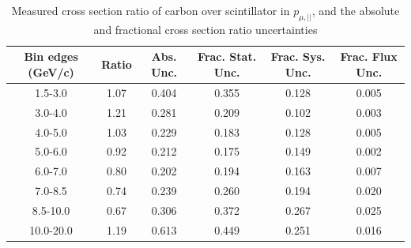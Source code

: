 \documentclass[../main.tex]{subfiles}
\begin{document}
\begin{table}
  \centering
  \renewcommand{\arraystretch}{1.15}
  \caption{Measured cross section ratio of carbon over scintillator in $p_{\mu,||}$, and the absolute and fractional cross section ratio uncertainties}
    \begin{tabular}{c||c|c||c|c|c}
      Bin edges (GeV/c) &  Ratio  &  Abs. Unc.  &  Frac. Stat. Unc.  &  Frac. Sys. Unc.  &  Frac. Flux Unc. \\
      \hline
      \hline
      1.5-3.0 & 1.07 & 0.404 & 0.355 & 0.128 & 0.005\\
      3.0-4.0 & 1.21 & 0.281 & 0.209 & 0.102 & 0.003\\
      4.0-5.0 & 1.03 & 0.229 & 0.183 & 0.128 & 0.005\\
      5.0-6.0 & 0.92 & 0.212 & 0.175 & 0.149 & 0.002\\
      6.0-7.0 & 0.80 & 0.202 & 0.194 & 0.163 & 0.007\\
      7.0-8.5 & 0.74 & 0.239 & 0.260 & 0.194 & 0.020\\
      8.5-10.0 & 0.67 & 0.306 & 0.372 & 0.267 & 0.025\\
      10.0-20.0 & 1.19 & 0.613 & 0.449 & 0.251 & 0.016
    \end{tabular}
  \label{tbl:rationucleonnuc6muon_pza}
\end{table}
\begin{table}
  \centering
  \renewcommand{\arraystretch}{1.15}
  \caption{Statistical covariance matrix of measured cross section ratio of carbon over scintillator in $p_{\mu,||}$}
  \label{tbl:rationucleonnuc6muon_pzb}
\end{table}
\end{document}
